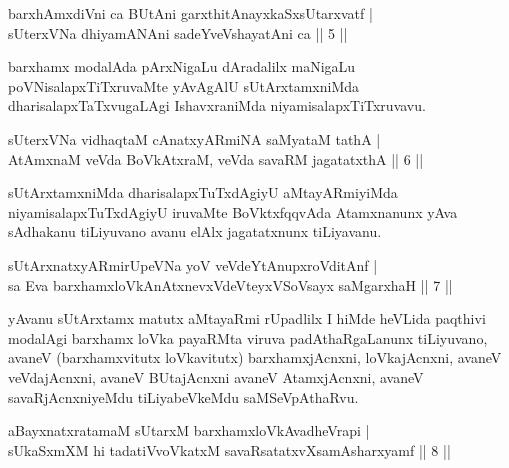 \begin{shl}
barxhAmxdiVni ca BUtAni garxthitAnayxkaSxsUtarxvatf |\\
sUterxVNa dhiyamANAni sadeYveVshayatAni ca \hfill || 5 ||
\end{shl}

\begin{artha}
barxhamx modalAda pArxNigaLu dAradalilx maNigaLu poVNisalapxTiTxruvaMte yAvA\-gAlU sUtArxtamxniMda dharisalapxTaTxvugaLAgi IshavxraniMda niyamisalapxTiTxruvavu.
\end{artha}


\begin{shl}
sUterxVNa vidhaqtaM cAnatxyARmiNA saMyataM tathA |\\
AtAmxnaM veVda BoVkAtxraM, veVda savaRM jagatatxthA \hfill || 6 ||
\end{shl}

\begin{artha}
sUtArxtamxniMda dharisalapxTuTxdAgiyU aMtayARmiyiMda niyamisalapxTuTx\-dAgiyU iruvaMte BoVktxfqqvAda Atamxnanunx yAva sAdhakanu tiLiyuvano avanu elAlx jagatatxnunx tiLiyavanu.
\end{artha}

\begin{shl}
sUtArxnatxyARmirUpeVNa \footnotemark[1]{}yoV veVdeYtAnupxroVditAnf |\\
sa Eva barxhamxloVkAnAtxnevxVdeVteyxVSoV\s sayx saMgarxhaH \hfill || 7 ||
\end{shl}

\begin{artha}
yAvanu sUtArxtamx matutx aMtayaRmi rUpadlilx I hiMde heVLida paqthivi modalAgi barxhamx loVka payaRMta viruva padAthaRgaLanunx tiLiyuvano, avaneV (barxhamxvitutx loVkavitutx) barxhamxjAcnxni, loVkajAcnxni, avaneV veVdajAcnxni, avaneV BUtajAcnxni avaneV AtamxjAcnxni, avaneV savaRjAcnxniyeMdu tiLiyabeVkeMdu saMSeVpAthaRvu.
\end{artha}

\begin{shl}
aBayxnatxratamaM sUtarxM barxhamxloVkAvadheVrapi |\\
sUkaSxmXM hi tadatiVvoVkatxM savaRsatatxvXsamAsharxyamf \hfill || 8 ||
\end{shl}

